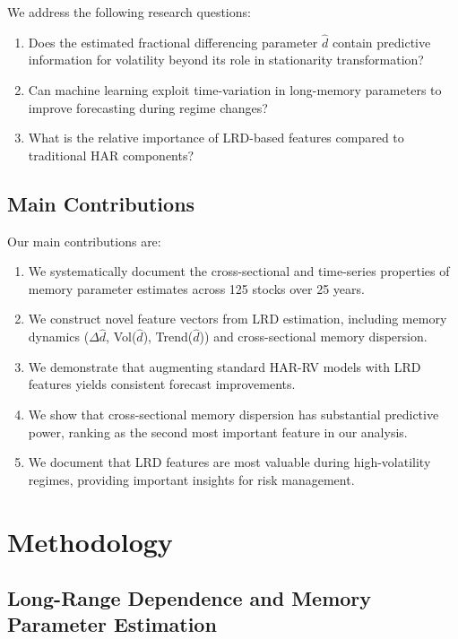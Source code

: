 \documentclass[12pt,a4paper]{article}
\begin{document}
We address the following research questions:
\begin{enumerate}
    \item Does the estimated fractional differencing parameter $\hat{d}$ contain predictive information for volatility beyond its role in stationarity transformation?
    \item Can machine learning exploit time-variation in long-memory parameters to improve forecasting during regime changes?
    \item What is the relative importance of LRD-based features compared to traditional HAR components?
\end{enumerate}

\subsection{Main Contributions}

Our main contributions are:
\begin{enumerate}
    \item We systematically document the cross-sectional and time-series properties of memory parameter estimates across 125 stocks over 25 years.
    \item We construct novel feature vectors from LRD estimation, including memory dynamics ($\Delta\hat{d}$, Vol($\hat{d}$), Trend($\hat{d}$)) and cross-sectional memory dispersion.
    \item We demonstrate that augmenting standard HAR-RV models with LRD features yields consistent forecast improvements.
    \item We show that cross-sectional memory dispersion has substantial predictive power, ranking as the second most important feature in our analysis.
    \item We document that LRD features are most valuable during high-volatility regimes, providing important insights for risk management.
\end{enumerate}

\section{Methodology}
\label{sec:methodology}

\subsection{Long-Range Dependence and Memory Parameter Estimation}
\end{document}
